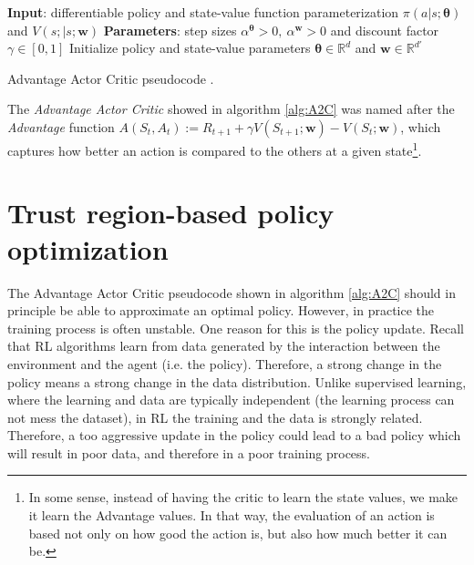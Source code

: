 \documentclass[twoside,twocolumn]{article}
\begin{document}
\begin{algorithm}[h]
 \textbf{Input}: differentiable policy and state-value function parameterization $\pi(a|s;\boldsymbol{\theta})$ and $V(s;|s;\boldsymbol{w})$\;
 \textbf{Parameters}: step sizes $\alpha^{\boldsymbol{\theta}}>0,\  \alpha^{\boldsymbol{w}}>0$ and discount factor $\gamma \in [0,1]$\;
 Initialize policy and state-value parameters $\boldsymbol{\theta}\in\mathbb{R}^d$ and $\boldsymbol{w}\in\mathbb{R}^{d'}$\;
 \caption{Advantage Actor Critic pseudocode \cite{Sutton1998}.}
 \label{alg:A2C}
\end{algorithm}

The \emph{Advantage Actor Critic} showed in algorithm \ref{alg:A2C} was named after the \emph{Advantage} function $A(S_t, A_t):=R_{t+1} + \gamma V(S_{t+1};\boldsymbol{w}) - V(S_{t};\boldsymbol{w})$, which captures how better an action is compared to the others at a given state\footnote{In some sense, instead of having the critic to learn the state values, we make it learn the Advantage values. In that way, the evaluation of an action is based not only on how good the action is, but also how much better it can be.}.

\section{Trust region-based policy optimization}

The Advantage Actor Critic pseudocode shown in algorithm \ref{alg:A2C} should in principle be able to approximate an optimal policy. However, in practice the training process is often unstable. One reason for this is the policy update. Recall that RL algorithms learn from data generated by the interaction between the environment and the agent (i.e. the policy). Therefore, a strong change in the policy means a strong change in the data distribution. Unlike supervised learning, where the learning and data are typically independent (the learning process can not mess the dataset), in RL the training and the data is strongly related. Therefore, a too aggressive update in the policy could lead to a bad policy which will result in poor data, and therefore in a poor training process.
\end{document}
